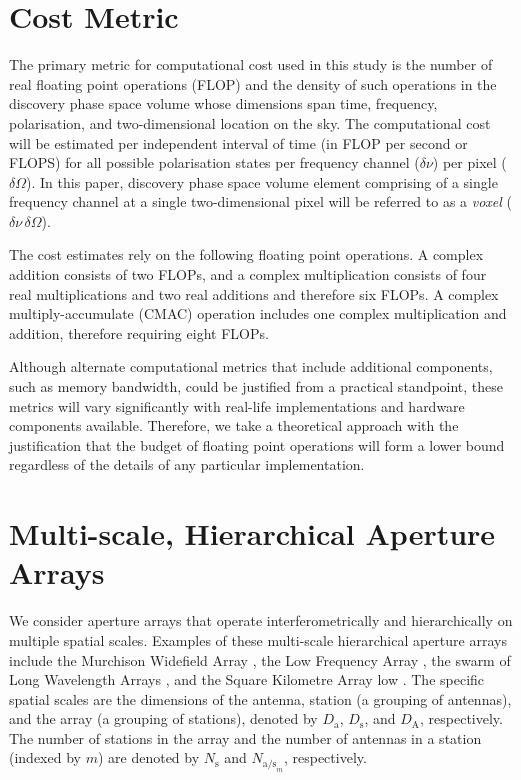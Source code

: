 \documentclass[
  journal=pasa,
  manuscript=article-type,
  year=2020,
  volume=37,
]{cup-journal}
\begin{document}
\section{Cost Metric} \label{sec:computational-cost}

The primary metric for computational cost used in this study is the number of real floating point operations (FLOP) and the density of such operations in the discovery phase space volume whose dimensions span time, frequency, polarisation, and two-dimensional location on the sky. The computational cost will be estimated per independent interval of time (in FLOP per second or FLOPS) for all possible polarisation states per frequency channel ($\delta\nu$) per pixel ($\delta\Omega$). In this paper, discovery phase space volume element comprising of a single frequency channel at a single two-dimensional pixel will be referred to as a \textit{voxel} ($\delta\nu\,\delta\Omega$).

The cost estimates rely on the following floating point operations. A complex addition consists of two FLOPs, and a complex multiplication consists of four real multiplications and two real additions and therefore six FLOPs. A complex multiply-accumulate (CMAC) operation includes one complex multiplication and addition, therefore requiring eight FLOPs.

Although alternate computational metrics that include additional components, such as memory bandwidth, could be justified from a practical standpoint, these metrics will vary significantly with real-life implementations and hardware components available. Therefore, we take a theoretical approach with the justification that the budget of floating point operations will form a lower bound regardless of the details of any particular implementation. 

\section{Multi-scale, Hierarchical Aperture Arrays} \label{sec:multi-scale-arrays}

We consider aperture arrays that operate interferometrically and hierarchically on multiple spatial scales. Examples of these multi-scale hierarchical aperture arrays include the Murchison Widefield Array \cite[MWA;][]{Tingay+2013}, the Low Frequency Array \cite[LOFAR;][]{vanHaarlem+2013}, the swarm of Long Wavelength Arrays \cite[LWA Swarm;][]{Dowell+2018}, and the Square Kilometre Array low \cite[SKA-low;][]{Dewdney+2009}. The specific spatial scales are the dimensions of the antenna, station (a grouping of antennas), and the array (a grouping of stations), denoted by $D_\textrm{a}$, $D_\textrm{s}$, and $D_\textrm{A}$, respectively. The number of stations in the array and the number of antennas in a station (indexed by $m$) are denoted by $N_\textrm{s}$ and $N_{\textrm{a/s}_m}$, respectively. 
\end{document}
